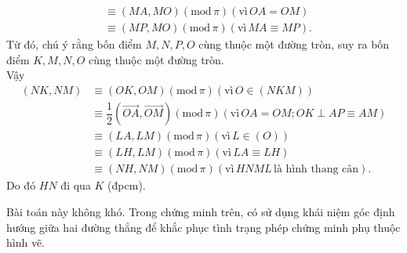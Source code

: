 \begin{bt}
{{\begin{align*}
			&\equiv (MA,MO) (\text{mod}\, \pi) (\text{vì}\, OA = OM)\\
			&\equiv (MP,MO) (\text{mod}\, \pi) (\text{vì}\, MA\equiv MP).
			\end{align*}
		}
		Từ đó, chú ý rằng bốn điểm $M,N,P,O$ cùng thuộc một đường tròn, suy ra bốn điểm $K,M,N,O$ cùng thuộc một đường tròn.\\
		Vậy
		{\allowdisplaybreaks
			\begin{align*}
			(NK,NM)&\equiv (OK,OM) (\text{mod}\, \pi) (\text{vì}\, O\in (NKM))\\
			&\equiv \dfrac{1}{2}(\overrightarrow{OA},\overrightarrow{OM}) (\text{mod}\, \pi) (\text{vì}\, OA=OM; OK\perp AP\equiv AM)\\
			&\equiv (LA,LM) (\text{mod}\, \pi)(\text{vì}\, L\in(O))\\
			&\equiv (LH,LM) (\text{mod}\, \pi)(\text{vì}\, LA\equiv LH)\\
			&\equiv (NH,NM) (\text{mod}\, \pi)(\text{vì}\, HNML\, \text{là hình thang cân}).
			\end{align*}}Do đó $HN$ đi qua $K$ (đpcm).
		\begin{nx}
			Bài toán này không khó. Trong chứng minh trên, có sử dụng khái niệm góc định hướng giữa hai đường thẳng để khắc phục tình trạng phép chứng minh phụ thuộc hình vẽ.
		\end{nx}
	}
\end{bt}
